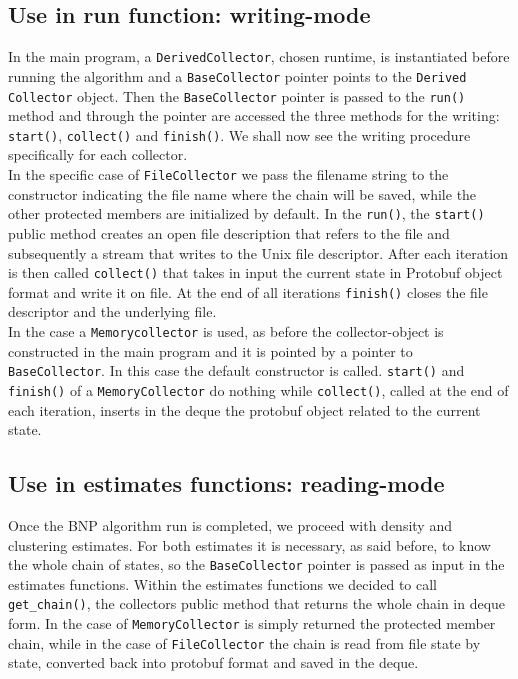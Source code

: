 \subsection{Use in run function: writing-mode}
In the main program, a \verb|DerivedCollector|, chosen runtime, is instantiated before running the algorithm and a \verb|BaseCollector| pointer points to the \verb|Derived Collector| object.
Then the \verb|BaseCollector| pointer is passed to the \verb|run()| method and through the pointer are accessed the three methods for the writing: \verb|start()|, \verb|collect()| and \verb|finish()|.
We shall now see the writing procedure specifically for each collector. \\
In the specific case of \verb|FileCollector| we pass the filename string to the constructor indicating the file name where the chain will be saved, while the other protected members are initialized by default. In the \verb|run()|, the \verb|start()| public method creates an open file description that refers to the file and subsequently a stream that writes to the Unix file descriptor. After each iteration is then called \verb|collect()| that takes in input the current state in Protobuf object format and write it on file. At the end of all iterations \verb|finish()| closes the file descriptor and the underlying file. \\
In the case a \verb|Memorycollector| is used, as before the collector-object is constructed in the main program and it is pointed by a pointer to \verb|BaseCollector|. In this case the default constructor is called. \verb|start()| and \verb|finish()| of a \verb|MemoryCollector| do nothing while \verb|collect()|, called at the end of each iteration, inserts in the deque the protobuf object related to the current state.

\subsection{Use in estimates functions: reading-mode}
Once the BNP algorithm run is completed, we proceed with density and clustering estimates. For both estimates it is necessary, as said before, to know the whole chain of states, so the \verb|BaseCollector| pointer is passed as input in the estimates functions. Within the estimates functions we decided to call \verb|get_chain()|, the collectors public method that returns the whole chain in deque form. In the case of \verb|MemoryCollector| is simply returned the protected member chain, while in the case of \verb|FileCollector| the chain is read from file state by state, converted back into protobuf format and saved in the deque.

